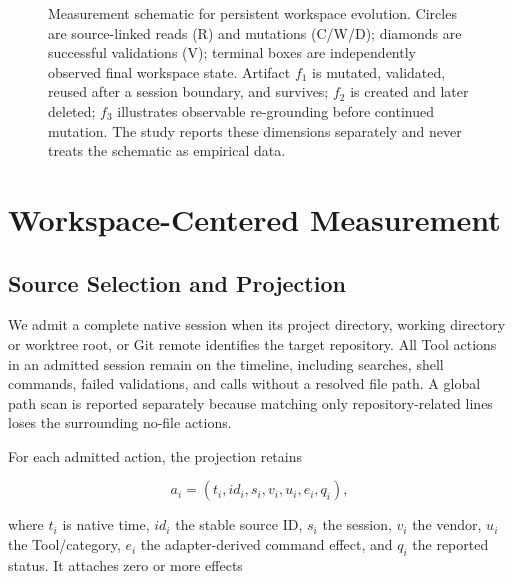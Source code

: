 \documentclass[letterpaper]{article}
\begin{document}
\begin{figure}[t]
{}
\caption{Measurement schematic for persistent workspace evolution.  Circles
are source-linked reads (R) and mutations (C/W/D); diamonds are successful
validations (V); terminal boxes are independently observed final workspace
state.  Artifact $f_1$ is mutated, validated, reused after a session boundary, and
survives; $f_2$ is created and later deleted; $f_3$ illustrates observable
re-grounding before continued mutation.  The study reports these dimensions
separately and never treats the schematic as empirical data.}
\label{fig:process-measures}
\end{figure}

\section{Workspace-Centered Measurement}
\label{sec:method}

\subsection{Source Selection and Projection}

We admit a complete native session when its project directory, working
directory or worktree root, or Git remote identifies the target repository.
All Tool actions in an admitted session remain on the timeline, including
searches, shell commands, failed validations, and calls without a resolved
file path.  A global path scan is reported separately because matching only
repository-related lines loses the surrounding no-file actions.

For each admitted action, the projection retains

\begin{equation}
a_i=(t_i,id_i,s_i,v_i,u_i,e_i,q_i),
\end{equation}

where $t_i$ is native time, $id_i$ the stable source ID, $s_i$ the session,
$v_i$ the vendor, $u_i$ the Tool/category, $e_i$ the adapter-derived command
effect, and $q_i$ the reported status.  It attaches zero or more effects
\end{document}

